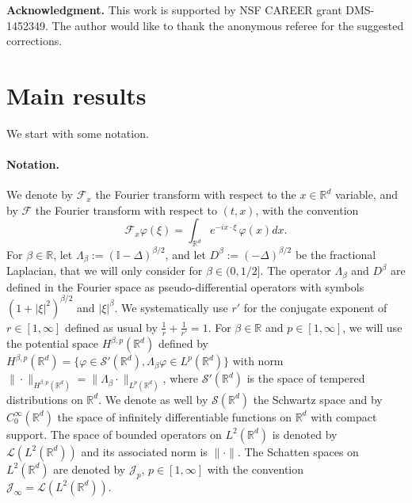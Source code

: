 \documentclass[12pt]{article}
\def \Rm {\mathbb R}
\def\II{\mathbb{I}}
\newcommand{\calL}{\mathcal L}
\newcommand{\calF}{\mathcal F}
\newcommand{\calS}{\mathcal S}
\newcommand{\calJ}{\mathcal J}
\begin{document}
\noindent \textbf{Acknowledgment.} This work is supported by NSF CAREER grant DMS-1452349. The author would like to thank the anonymous referee for the suggested corrections.

\section{Main results} \label{secresults}
We start with some notation.

\paragraph{Notation.} We denote by $\calF_x$ the Fourier transform with respect to the $x \in \Rm^d$ variable, and by $\calF$ the Fourier transform with respect to $(t,x)$, with the convention
$$
\calF_x \varphi(\xi)=\int_{\Rm^d} e^{-i x \cdot \xi} \, \varphi(x) dx.
$$ For $\beta \in \Rm$, let $\Lambda_\beta:=(\II-\Delta)^{\beta/2}$, and let $D^\beta:=(-\Delta)^{\beta/2}$ be the fractional Laplacian, that we will only consider for $\beta \in (0,1/2]$. The operator $\Lambda_\beta$ and $D^\beta$ are defined in the Fourier space as pseudo-differential operators with symbols $(1+|\xi|^2)^{\beta/2}$ and $|\xi|^{\beta}$. We systematically use $r'$ for the conjugate exponent of $r \in [1,\infty]$ defined as usual by $\frac{1}{r}+\frac{1}{r'}=1$.
For $\beta \in \Rm$ and $p\in[1,\infty]$, we will use the potential space $H^{\beta,p}(\Rm^d)$ defined by $H^{\beta,p}(\Rm^d)=\{ \varphi \in \calS'(\Rm^d), \Lambda_\beta \varphi \in L^p(\Rm^d) \}$ with norm $\| \cdot \|_{H^{\beta,p}(\Rm^d)}=\| \Lambda_\beta \cdot \|_{L^p(\Rm^d)}$, where $\calS'(\Rm^d)$ is the space of tempered distributions on $\Rm^d$. We denote as well by $\calS(\Rm^d)$ the Schwartz space and by $C_0^\infty(\Rm^d)$ the space of infinitely differentiable functions on $\Rm^d$ with compact support. The space of bounded operators on $L^2(\Rm^d)$ is denoted by $\calL(L^2(\Rm^d))$ and its associated norm is $\| \cdot \|$. The Schatten spaces on $L^2(\Rm^d)$ are denoted by $\calJ_p$, $p \in [1,\infty]$ with the convention $\calJ_\infty=\calL(L^2(\Rm^d))$.
\end{document}
